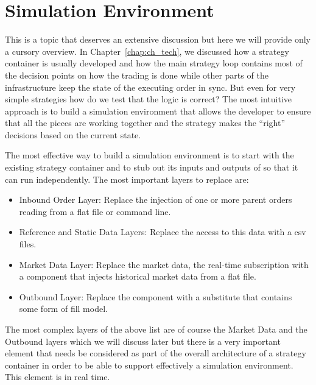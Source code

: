 \section{Simulation Environment}

This is a topic that deserves an extensive discussion but here we will provide only a cursory overview. In Chapter~\ref{chap:ch_tech}, we discussed how a strategy container is usually developed and how the main strategy loop contains most of the decision points on how the trading is done while other parts of the infrastructure keep the state of the executing order in sync. But even for very simple strategies how do we test that the logic is correct? The most intuitive approach is to build a simulation environment that allows the developer to ensure that all the pieces are working together and the strategy makes the ``right'' decisions based on the current state. 


The most effective way to build a simulation environment is to start with the existing strategy container and to stub out its inputs and outputs of so that it can run independently.  The most important layers to replace are:
        \begin{itemize}
        \item Inbound Order Layer: Replace the injection of one or more parent orders reading from a flat file or command line.
        \item Reference and Static Data Layers: Replace the access to this data with a csv files.
        \item Market Data Layer: Replace the market data, the real-time subscription with a component that injects historical market data from a flat file.
        \item Outbound Layer: Replace the component with a substitute that contains some form of fill model.
        \end{itemize}

The most complex layers of the above list are of course the Market Data and the Outbound layers which we will discuss later but there is a very important element that needs be considered as part of the overall architecture of a strategy container in order to be able to support effectively a simulation environment. This element is in real time. \twomedskip


